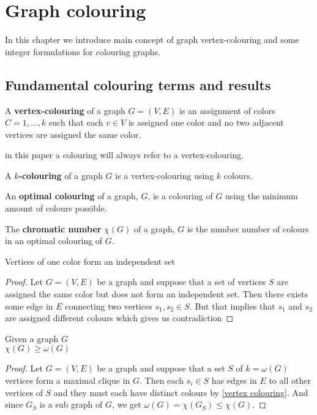 \chapter{Graph colouring}
In this chapter we introduce main concept of graph vertex-colouring and some integer formulations for colouring graphs.
\section{Fundamental colouring terms and results}
\begin{definition}\label{vertex colouring}
A \textbf{vertex-colouring} of a graph $G=(V,E)$ is an assignment of colors $C = {1,...,k}$ such that each $v\in V$ is assigned one color and no two adjacent vertices are assigned the same color.
\end{definition}
in this paper a colouring will always refer to a vertex-colouring.
\begin{definition}
A \textbf{$k$-colouring} of a graph $G$ is a vertex-colouring using $k$ colours.
\end{definition}
\begin{definition}\label{cromatic number}
An \textbf{optimal colouring} of a graph, $G$, is a colouring of $G$ using the minimum amount of colours possible.
\end{definition}
\begin{definition}\label{cromatic number}
The \textbf{chromatic number} $\chi (G)$ of a graph, $G$ is the number number of colours in an optimal colouring of $G$.
\end{definition}
\begin{theorem}
Vertices of one color form an independent set
\begin{proof}
Let $G=(V,E)$ be a graph and suppose that a set of vertices $S$ are assigned the same color but does not form an independent set. Then there exists some edge in $E$ connecting two vertices $s_1,s_2 \in S$. But that implies that $s_1$ and $s_2$ are assigned different colours which gives us contradiction
\end{proof}
\end{theorem}
\begin{theorem}
Given a graph $G$\\
$\chi (G) \geq \omega(G)$
\begin{proof}
Let $G=(V,E)$ be a graph and suppose that a set $S$ of $k = \omega(G)$ vertices form a maximal clique in $G$. Then each $s_i \in S$ has edges in $E$ to all other vertices of $S$ and they must each have distinct colours by \ref{vertex colouring}. And since $G_S$ is a sub graph of $G$, we get $\omega(G)= \chi(G_S) \leq \chi(G)$.
\end{proof}
\end{theorem}
